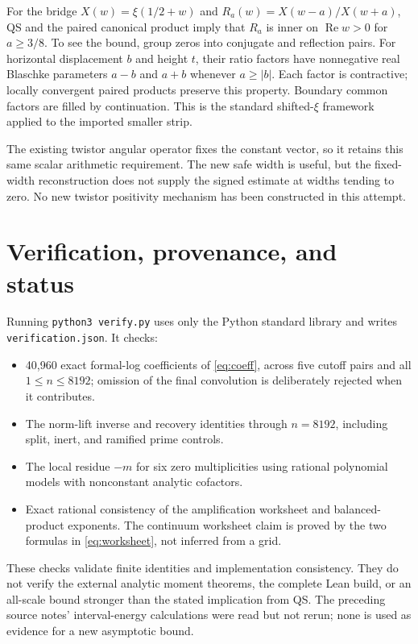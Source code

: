 \documentclass[11pt]{article}
\newcommand{\Ree}{\operatorname{Re}}
\begin{document}
For the bridge $X(w)=\xi(1/2+w)$ and $R_a(w)=X(w-a)/X(w+a)$,
QS and the paired canonical product imply that $R_a$ is inner on
$\Ree w>0$ for $a\ge3/8$. To see the bound, group zeros into conjugate
and reflection pairs. For horizontal displacement $b$ and height $t$,
their ratio factors have nonnegative real Blaschke parameters $a-b$ and
$a+b$ whenever $a\ge|b|$. Each factor is contractive; locally convergent
paired products preserve this property. Boundary common factors are
filled by continuation. This is the standard shifted-$\xi$ framework
\cite{suzuki} applied to the imported smaller strip.

The existing twistor angular operator fixes the constant vector, so it
retains this same scalar arithmetic requirement. The new safe width is
useful, but the fixed-width reconstruction does not supply the signed
estimate at widths tending to zero. No new twistor positivity mechanism
has been constructed in this attempt.

\section{Verification, provenance, and status}
Running \texttt{python3 verify.py} uses only the Python standard library
and writes \texttt{verification.json}. It checks:
\begin{itemize}
\item 40,960 exact formal-log coefficients of \eqref{eq:coeff}, across
five cutoff pairs and all $1\le n\le8192$; omission of the final
convolution is deliberately rejected when it contributes.
\item The norm-lift inverse and recovery identities through $n=8192$,
including split, inert, and ramified prime controls.
\item The local residue $-m$ for six zero multiplicities using rational
polynomial models with nonconstant analytic cofactors.
\item Exact rational consistency of the amplification worksheet and
balanced-product exponents. The continuum worksheet claim is proved
by the two formulas in \eqref{eq:worksheet}, not inferred from a grid.
\end{itemize}
These checks validate finite identities and implementation consistency.
They do not verify the external analytic moment theorems, the complete
Lean build, or an all-scale bound stronger than the stated implication
from QS. The preceding source notes' interval-energy calculations were
read but not rerun; none is used as evidence for a new asymptotic bound.
\end{document}
